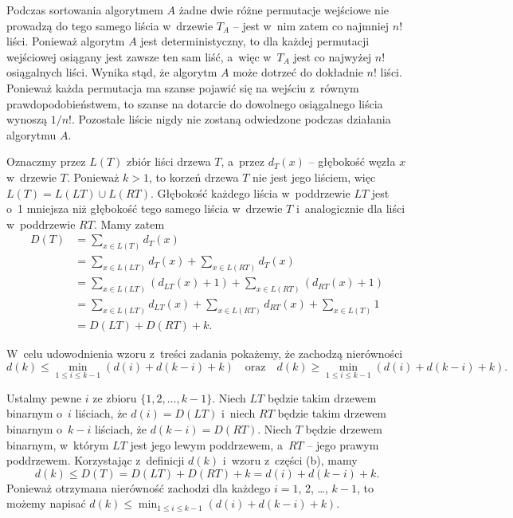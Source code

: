 
\subproblem %
Podczas sortowania algorytmem $A$ żadne dwie różne permutacje wejściowe nie prowadzą do tego samego liścia w~drzewie $T_A$ -- jest w~nim zatem co najmniej $n!$ liści.
Ponieważ algorytm $A$ jest deterministyczny, to dla każdej permutacji wejściowej osiągany jest zawsze ten sam liść, a~więc w~$T_A$ jest co najwyżej $n!$ osiągalnych liści.
Wynika stąd, że algorytm $A$ może dotrzeć do dokładnie $n!$ liści.
Ponieważ każda permutacja ma szanse pojawić się na wejściu z~równym prawdopodobieństwem, to szanse na dotarcie do dowolnego osiągalnego liścia wynoszą $1/n!$.
Pozostałe liście nigdy nie zostaną odwiedzone podczas działania algorytmu $A$.

\subproblem %
Oznaczmy przez $L(T)$ zbiór liści drzewa $T$, a~przez $d_T(x)$ -- głębokość węzła $x$ w~drzewie $T$.
Ponieważ $k>1$, to korzeń drzewa $T$ nie jest jego liściem, więc $L(T)=L(LT)\cup L(RT)$.
Głębokość każdego liścia w~poddrzewie $LT$ jest o~1 mniejsza niż głębokość tego samego liścia w~drzewie $T$ i~analogicznie dla liści w~poddrzewie $RT$.
Mamy zatem
\begin{align*}
    D(T) &= \sum_{x\in L(T)}d_T(x) \\
	&= \sum_{x\in L(LT)}d_T(x)+\sum_{x\in L(RT)}d_T(x) \\
	&= \sum_{x\in L(LT)}(d_{LT}(x)+1)+\sum_{x\in L(RT)}(d_{RT}(x)+1) \\
	&= \sum_{x\in L(LT)}d_{LT}(x)+\sum_{x\in L(RT)}d_{RT}(x)+\sum_{x\in L(T)}1 \\[1mm]
	&= D(LT)+D(RT)+k.
\end{align*}

\subproblem %

\noindent W~celu udowodnienia wzoru z~treści zadania pokażemy, że zachodzą nierówności
\[
    d(k) \le \min_{1\le i\le k-1}(d(i)+d(k-i)+k) \quad\text{oraz}\quad d(k) \ge \min_{1\le i\le k-1}(d(i)+d(k-i)+k).
\]

Ustalmy pewne $i$ ze zbioru $\{1,2,\dots,k-1\}$.
Niech $LT$ będzie takim drzewem binarnym o~$i$ liściach, że $d(i)=D(LT)$ i~niech $RT$ będzie takim drzewem binarnym o~$k-i$ liściach, że $d(k-i)=D(RT)$.
Niech $T$ będzie drzewem binarnym, w~którym $LT$ jest jego lewym poddrzewem, a~$RT$ -- jego prawym poddrzewem.
Korzystając z~definicji $d(k)$ i~wzoru z~części (b), mamy
\[
    d(k) \le D(T) = D(LT)+D(RT)+k = d(i)+d(k-i)+k.
\]
Ponieważ otrzymana nierówność zachodzi dla każdego $i=1$, 2, \dots, $k-1$, to możemy napisać $d(k)\le\min_{1\le i\le k-1}(d(i)+d(k-i)+k)$.


